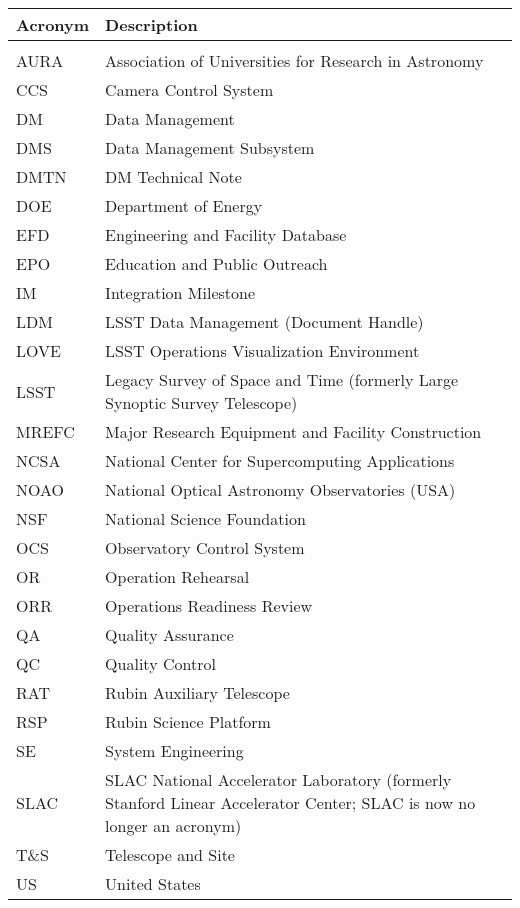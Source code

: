 \addtocounter{table}{-1}
\begin{longtable}{p{}p{}}\hline
\textbf{Acronym} & \textbf{Description}  \\\hline

 &  \\\hline
AURA & Association of Universities for Research in Astronomy \\\hline
CCS & Camera Control System \\\hline
DM & Data Management \\\hline
DMS & Data Management Subsystem \\\hline
DMTN & DM Technical Note \\\hline
DOE & Department of Energy \\\hline
EFD & Engineering and Facility Database \\\hline
EPO & Education and Public Outreach \\\hline
IM & Integration Milestone \\\hline
LDM & LSST Data Management (Document Handle) \\\hline
LOVE & LSST Operations Visualization Environment \\\hline
LSST & Legacy Survey of Space and Time (formerly Large Synoptic Survey Telescope) \\\hline
MREFC & Major Research Equipment and Facility Construction \\\hline
NCSA & National Center for Supercomputing Applications \\\hline
NOAO & National Optical Astronomy Observatories (USA) \\\hline
NSF & National Science Foundation \\\hline
OCS & Observatory Control System \\\hline
OR & Operation Rehearsal \\\hline
ORR & Operations Readiness Review \\\hline
QA & Quality Assurance \\\hline
QC & Quality Control \\\hline
RAT & Rubin Auxiliary Telescope \\\hline
RSP & Rubin Science Platform \\\hline
SE & System Engineering \\\hline
SLAC & SLAC National Accelerator Laboratory (formerly Stanford Linear Accelerator Center; SLAC is now no longer an acronym) \\\hline
T\&S & Telescope and Site \\\hline
US & United States \\\hline
\end{longtable}
